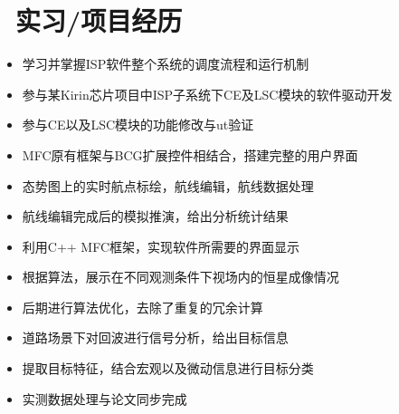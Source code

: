 \documentclass{resume}
\begin{document}
\section{\faUsers\ 实习/项目经历}

\begin{itemize}[topsep = 0 pt, partopsep = 0pt]
  \item 学习并掌握ISP软件整个系统的调度流程和运行机制
  \item 参与某Kirin芯片项目中ISP子系统下CE及LSC模块的软件驱动开发
  \item 参与CE以及LSC模块的功能修改与ut验证
\end{itemize}


\begin{itemize}[topsep = 0 pt, partopsep = 0pt]
  \item MFC原有框架与BCG扩展控件相结合，搭建完整的用户界面
  \item 态势图上的实时航点标绘，航线编辑，航线数据处理
  \item 航线编辑完成后的模拟推演，给出分析统计结果
\end{itemize}

\begin{itemize}[topsep = 0 pt, partopsep = 0pt]
  \item 利用C++ MFC框架，实现软件所需要的界面显示
  \item 根据算法，展示在不同观测条件下视场内的恒星成像情况
  \item 后期进行算法优化，去除了重复的冗余计算
\end{itemize}
\begin{itemize}[topsep = 0 pt, partopsep = 0pt]
  \item 道路场景下对回波进行信号分析，给出目标信息
  \item 提取目标特征，结合宏观以及微动信息进行目标分类
  \item 实测数据处理与论文同步完成
\end{itemize}
\end{document}
